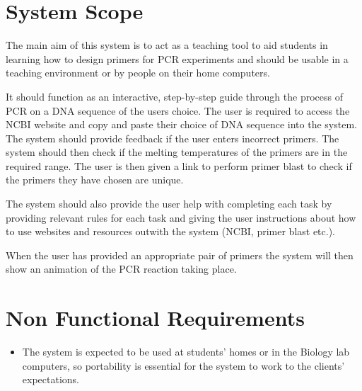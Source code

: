 \documentclass{l3deliverable}
\begin{document}

\section{System Scope}

The main aim of this system is to act as a teaching tool to aid students
in learning how to design primers for PCR experiments and should be
usable in a teaching environment or by people on their home computers.

It should function as an interactive, step-by-step guide through the
process of PCR on a DNA sequence of the users choice. The user is
required to access the NCBI website and copy and paste their choice of
DNA sequence into the system. The system should provide feedback if the
user enters incorrect primers. The system should then check if the
melting temperatures of the primers are in the required range. The user
is then given a link to perform primer blast to check if the primers
they have chosen are unique.

The system should also provide the user help with completing each task
by providing relevant rules for each task and giving the user
instructions about how to use websites and resources outwith the system
(NCBI, primer blast etc.).

When the user has provided an appropriate pair of primers the system
will then show an animation of the PCR reaction taking place.



\section{Non Functional Requirements}


\begin{itemize}
\item{
The system is expected to be used at students' homes or in the Biology
lab computers, so portability is essential for the system to work to
the clients' expectations.
}
\end{itemize}

\end{document}
